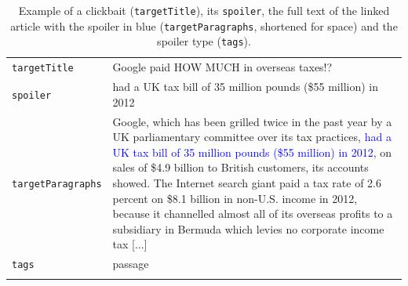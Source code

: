 \documentclass[12pt]{article}
\begin{document}
\begin{table}[t!]
\small
    \begin{center}
     \begin{tabular}{lp{4.5cm}}
\toprule
\texttt{targetTitle} & Google paid HOW MUCH in overseas taxes!? \\
\texttt{spoiler} & had a UK tax bill of 35 million pounds (\$55 million) in 2012 \\
\texttt{targetParagraphs} & Google, which has been grilled twice in the past year by a UK parliamentary committee over its tax practices, \textcolor{blue}{had a UK tax bill of 35 million pounds (\$55 million) in 2012}, on sales of \$4.9 billion to British customers, its accounts showed. The Internet search giant paid a tax rate of 2.6 percent on \$8.1 billion in non-U.S. income in 2012, because it channelled almost all of its overseas profits to a subsidiary in Bermuda which levies no corporate income tax [...]\\

\texttt{tags} & passage \\
\\ \bottomrule
\end{tabular}
\caption{Example of a clickbait (\texttt{targetTitle}), its \texttt{spoiler}, the full text of the linked article with the spoiler in blue (\texttt{targetParagraphs},  shortened for space) and the spoiler type (\texttt{tags}).}
\label{tab:data_example}
      \end{center}
      \end{table}
 
\end{document}
